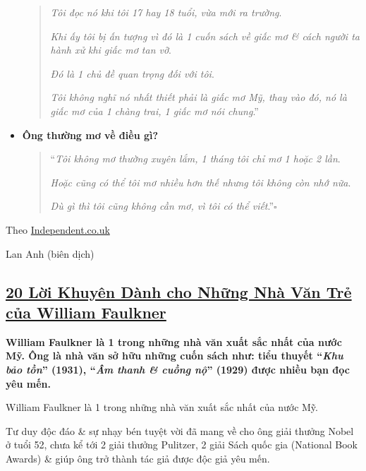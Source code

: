 \documentclass{article}
\begin{document}
\begin{itemize}
\begin{quotation}
		\textit{Tôi đọc nó khi tôi 17 hay 18 tuổi, vừa mới ra trường}.
		
		\textit{Khi ấy tôi bị ấn tượng vì đó là 1 cuốn sách về giấc mơ \& cách người ta hành xử khi giấc mơ tan vỡ}.
		
		\textit{Đó là 1 chủ đề quan trọng đối với tôi}.
		
		\textit{Tôi không nghĩ nó nhất thiết phải là giấc mơ Mỹ, thay vào đó, nó là giấc mơ của 1 chàng trai, 1 giấc mơ nói chung}.''
	\end{quotation}
	
	\item \textbf{Ông thường mơ về điều gì?}
	
	\begin{quotation}
		``\textit{Tôi không mơ thường xuyên lắm, 1 tháng tôi chỉ mơ 1 hoặc 2 lần}.
		
		\textit{Hoặc cũng có thể tôi mơ nhiều hơn thế nhưng tôi không còn nhớ nữa}.
		
		\textit{Dù gì thì tôi cũng không cần mơ, vì tôi có thể viết}.''\hfill$\square$
	\end{quotation}    
\end{itemize}

\begin{flushright}
	Theo \href{https://www.independent.co.uk/arts-entertainment/books/features/haruki-murakami-interview-killing-commendatore-novel-new-a8578696.html}{Independent.co.uk}
	
	Lan Anh (biên dịch)
\end{flushright}


\subsection{\href{http://tramdoc.vn/tin-tuc/20-loi-khuyen-danh-cho-nhung-nha-van-tre-cua-william-faulkner-nZDe5W.html}{20 Lời Khuyên Dành cho Những Nhà Văn Trẻ của William Faulkner}}

\textbf{William Faulkner là 1 trong những nhà văn xuất sắc nhất của nước Mỹ. Ông là nhà văn sở hữu những cuốn sách như: tiểu thuyết ``\textit{Khu bảo tồn}'' (1931), ``\textit{Âm thanh \& cuồng nộ}'' (1929) được nhiều bạn đọc yêu mến.}

%
William Faulkner là 1 trong những nhà văn xuất sắc nhất của nước Mỹ.

Tư duy độc đáo \& sự nhạy bén tuyệt vời đã mang về cho ông giải thưởng Nobel ở tuổi 52, chưa kể tới 2 giải thưởng Pulitzer, 2 giải Sách quốc gia (National Book Awards) \& giúp ông trở thành tác giả được độc giả yêu mến.
\end{document}
